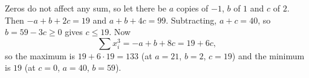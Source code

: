 Zeros do not affect any sum, so let there be $a$ copies of $-1$, $b$ of $1$ and $c$ of $2$. Then $-a+b+2c=19$ and $a+b+4c=99$. Subtracting, $a+c=40$, so $b=59-3c\ge0$ gives $c\le19$. Now
\[\sum x_i^3=-a+b+8c=19+6c,\]
so the maximum is $19+6\cdot19=\boxed{133}$ (at $a=21$, $b=2$, $c=19$) and the minimum is $\boxed{19}$ (at $c=0$, $a=40$, $b=59$).
